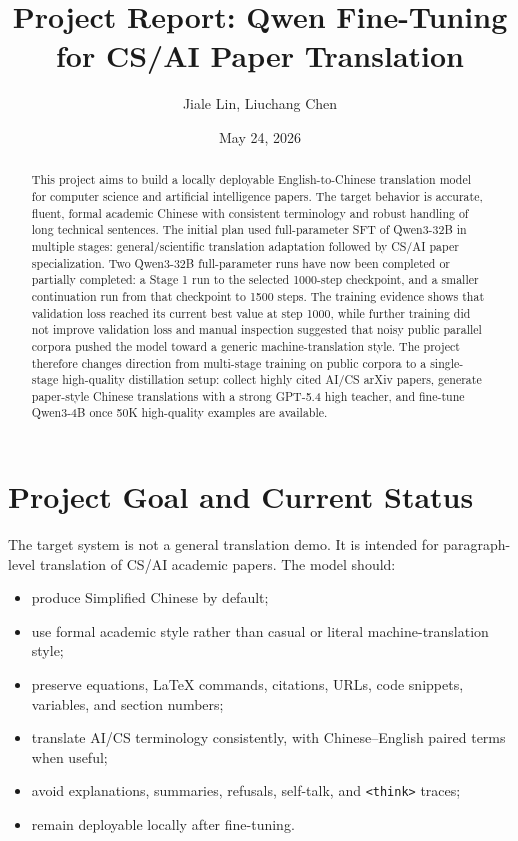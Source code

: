 \documentclass{article}
\title{\textbf{Project Report: Qwen Fine-Tuning for CS/AI Paper Translation}}
\author{Jiale Lin, Liuchang Chen}
\date{May 24, 2026}
\begin{document}
\maketitle

\begin{abstract}
    This project aims to build a locally deployable English-to-Chinese translation model for computer science and artificial intelligence papers. The target behavior is accurate, fluent, formal academic Chinese with consistent terminology and robust handling of long technical sentences. The initial plan used full-parameter SFT of Qwen3-32B in multiple stages: general/scientific translation adaptation followed by CS/AI paper specialization. Two Qwen3-32B full-parameter runs have now been completed or partially completed: a Stage 1 run to the selected 1000-step checkpoint, and a smaller continuation run from that checkpoint to 1500 steps. The training evidence shows that validation loss reached its current best value at step 1000, while further training did not improve validation loss and manual inspection suggested that noisy public parallel corpora pushed the model toward a generic machine-translation style. The project therefore changes direction from multi-stage training on public corpora to a single-stage high-quality distillation setup: collect highly cited AI/CS arXiv papers, generate paper-style Chinese translations with a strong GPT-5.4 high teacher, and fine-tune Qwen3-4B once 50K high-quality examples are available.
\end{abstract}

\section{Project Goal and Current Status}

The target system is not a general translation demo. It is intended for paragraph-level translation of CS/AI academic papers. The model should:

\begin{itemize}
    \item produce Simplified Chinese by default;
    \item use formal academic style rather than casual or literal machine-translation style;
    \item preserve equations, LaTeX commands, citations, URLs, code snippets, variables, and section numbers;
    \item translate AI/CS terminology consistently, with Chinese--English paired terms when useful;
    \item avoid explanations, summaries, refusals, self-talk, and \texttt{<think>} traces;
    \item remain deployable locally after fine-tuning.
\end{itemize}
\end{document}
